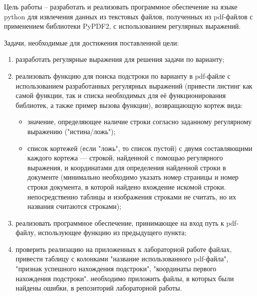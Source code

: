 
Цель работы -- разработать и реализовать программное обеспечение на языке python для извлечения данных из текстовых файлов, полученных из pdf-файлов с применением библиотеки PyPDF2, с использованием регулярных выражений.

Задачи, необходимые для достижения поставленной цели:
\begin{enumerate}
	\item разработать регулярные выражения для решения задачи по варианту;
	\item реализовать функцию для поиска подстроки по варианту в pdf-файле с использованием разработанных регулярных выражений (привести листинг как самой функции, так и списка необходимых для её функционирования библиотек, а также пример вызова функции), возвращающую кортеж вида: 
	\begin{itemize}
		\item значение, определяющее наличие строки согласно заданному регулярному выражению ("истина/ложь"); 
		\item список кортежей (если "ложь", то список пустой) с двумя составляющими каждого кортежа --- строкой, найденной с помощью регулярного выражения, и координатами для определения найденной строки в документе (минимально необходимо указать номер страницы и номер строки документа, в которой найдено вхождение искомой строки. непосредственно таблицы и изображения строками не считать, но их названия считаются строками);
	\end{itemize}
	\item реализовать программное обеспечение, принимающее на вход путь к pdf-файлу, использующее функцию из предыдущего пункта;
	\item проверить реализацию на приложенных к лабораторной работе файлах, привести таблицу с колонками "название использованного pdf-файла", "признак успешного нахождения подстроки", "координаты первого нахождения подстроки". необходимо приложить файлы, в которых были найдены ошибки, в репозиторий лабораторной работы.
\end{enumerate}


\clearpage
